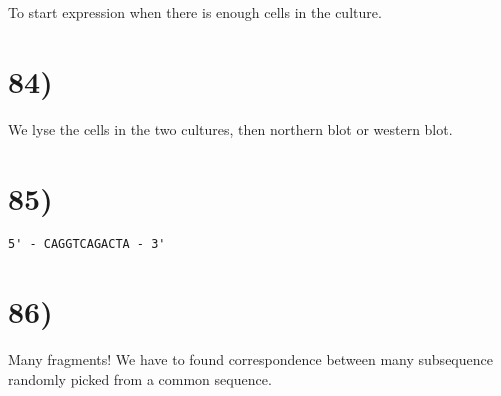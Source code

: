 To start expression when there is enough cells in the culture.

\section*{84)}
We lyse the cells in the two cultures, then northern blot or western blot.

\section*{85)}
\begin{verbatim}
5' - CAGGTCAGACTA - 3'
\end{verbatim}

\section*{86)}
Many fragments! We have to found correspondence between many subsequence randomly picked from a common sequence.

